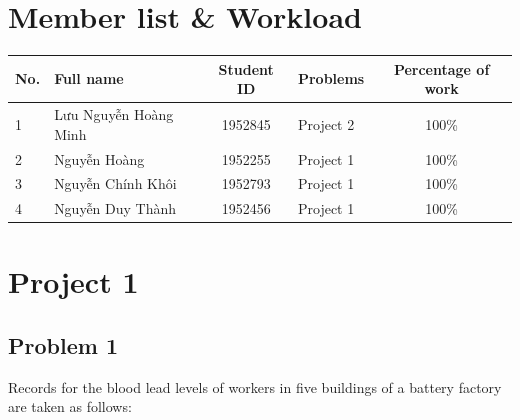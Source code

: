 \documentclass[a4paper]{article}
\numberwithin{equation}{section}
\begin{document}

\newpage
\tableofcontents
\newpage


\section*{Member list \& Workload}
\begin{center}
  \begin{tabular}{llclc}
    \toprule
    \textbf{No.} & \textbf{Full name}    & \textbf{Student ID} & \textbf{Problems} & \textbf{Percentage of work} \\
    \midrule
    1            & Lưu Nguyễn Hoàng Minh & 1952845             & Project 2         & 100\%                       \\
    2            & Nguyễn Hoàng          & 1952255             & Project 1         & 100\%                       \\
    3            & Nguyễn Chính Khôi     & 1952793             & Project 1         & 100\%                       \\
    4            & Nguyễn Duy Thành      & 1952456             & Project 1         & 100\%                       \\
    \bottomrule
  \end{tabular}
\end{center}


\newpage
\section{Project 1}
\subsection{Problem 1}

Records for the blood lead levels of workers in five buildings of a battery factory are taken as follows:
\end{document}
